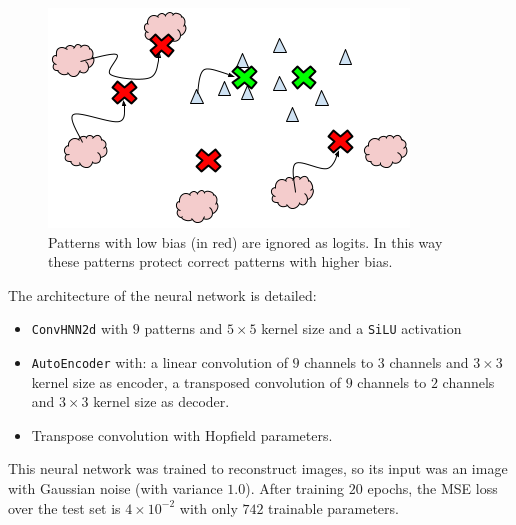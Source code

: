 \begin{figure}[htbp]
    \centering
    \includegraphics[width=0.6\linewidth]{Figures/anti-noising.png}
    \caption{Patterns with low bias (in red) are ignored as logits. In this way these patterns protect correct patterns with higher bias.}
\end{figure}

\noindent The architecture of the neural network is detailed:
\begin{itemize}
    \item \texttt{ConvHNN2d} with $9$ patterns and $5\times5$ kernel size and a \texttt{SiLU} activation
    \item \texttt{AutoEncoder} with: a linear convolution of $9$ channels to $3$ channels and $3\times3$ kernel size as encoder, a transposed convolution of $9$ channels to $2$ channels and $3\times3$ kernel size as decoder.
    \item Transpose convolution with Hopfield parameters.
\end{itemize}
This neural network was trained to reconstruct images, so its input was an image with Gaussian noise (with variance $1.0$). After training $20$ epochs, the MSE loss over the test set is $4 \times 10^{-2}$ with only $742$ trainable parameters.

